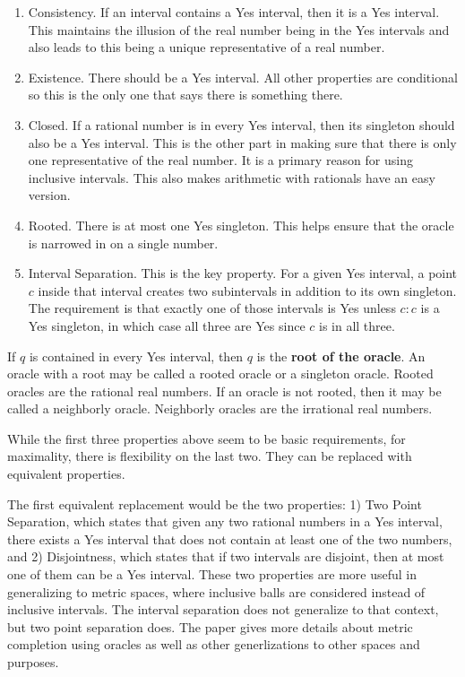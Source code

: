 \documentclass[12pt]{article}
\begin{document}
\begin{enumerate}
    \item Consistency. If an interval contains a Yes interval, then it is a Yes interval. This maintains the illusion of the real number being in the Yes intervals and also leads to this being a unique representative of a real number. 
    \item Existence. There should be a Yes interval. All other properties are conditional so this is the only one that says there is something there. 
    \item Closed. If a rational number is in every Yes interval, then its singleton should also be a Yes interval. This is the other part in making sure that there is only one representative of the real number. It is a primary reason for using inclusive intervals. This also makes arithmetic with rationals have an easy version.
    \item Rooted. There is at most one Yes singleton.  This helps ensure that the oracle is narrowed in on a single number. 
    \item Interval Separation. This is the key property. For a given Yes interval, a point $c$ inside that interval creates two subintervals in addition to its own singleton. The requirement is that exactly one of those intervals is Yes unless $c:c$ is a Yes singleton, in which case all three are Yes since $c$ is in all three.  
\end{enumerate}

If $q$ is contained in every Yes interval, then $q$ is the \textbf{root of the oracle}.  An oracle with a root may be called a rooted oracle or a singleton oracle. Rooted oracles are the rational real numbers. If an oracle is not rooted, then it may be called a neighborly oracle. Neighborly oracles are the irrational real numbers. 

While the first three properties above seem to be basic requirements, for maximality, there is flexibility on the last two. They can be replaced with equivalent properties.

The first equivalent replacement would be the two properties: 1) Two Point Separation, which states that given any two rational numbers in a Yes interval, there exists a Yes interval that does not contain at least one of the two numbers, and 2) Disjointness, which states that if two intervals are disjoint, then at most one of them can be a Yes interval. These two properties are more useful in generalizing to metric spaces, where inclusive balls are considered instead of inclusive intervals. The interval separation does not generalize to that context, but two point separation does. The paper \cite{taylor23metric} gives more details about metric completion using oracles as well as other generlizations to other spaces and purposes.  
\end{document}
